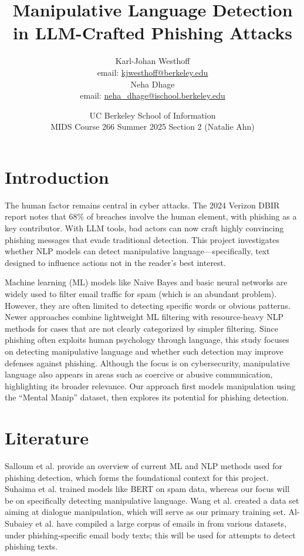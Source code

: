 \documentclass[
	letterpaper, %
	12pt, %
	unnumberedsections, %
	twoside, %
]{LTJournalArticle}
\title{Manipulative Language Detection in LLM-Crafted
Phishing Attacks
}  %
\author{
	Karl-Johan Westhoff \\
	email: \href{mailto:kjwesthoff@berkeley.edu}{kjwesthoff@berkeley.edu} \\
    Neha Dhage \\
	email: \href{mailto:neha_dhage@ischool.berkeley.edu}{neha\_dhage@ischool.berkeley.edu}
}
\date{UC Berkeley School of Information \\
MIDS Course 266 Summer 2025 Section 2 (Natalie Ahn) \\
}
\begin{document}
\maketitle %
\section{Introduction}
The human factor remains central in cyber attacks. The 2024 Verizon DBIR report \cite{verizon2024dbir} notes that 68\% of breaches involve the human element, with phishing as a key contributor. With LLM tools, bad actors can now craft highly convincing phishing messages that evade traditional detection.
This project investigates whether NLP models can detect manipulative language—specifically, text designed to influence actions not in the reader's best interest.

Machine learning (ML) models like Naive Bayes and basic neural networks are widely used to filter email traffic for spam (which is an abundant problem). However, they are often limited to detecting specific words or obvious patterns. Newer approaches combine lightweight ML filtering with resource-heavy NLP methods for cases that are not clearly categorized by simpler filtering. Since phishing often exploits human psychology through language, this study focuses on detecting manipulative language and whether such detection may improve defenses against phishing. Although the focus is on cybersecurity, manipulative language also appears in areas such as coercive or abusive communication, highlighting its broader relevance. Our approach first models manipulation using the “Mental Manip” dataset, then explores its potential for phishing detection.

\section{Literature}
Salloum et al. \cite{SALLOUM202119} provide an overview of current ML and NLP methods used for phishing detection, which forms the foundational context for this project.
Suhaima et al. \cite{ImprovedPhishing} trained models like BERT on spam data, whereas our focus will be on specifically detecting manipulative language.
Wang et al. \cite{MentalManip} created a data set aiming at dialogue manipulation, which will serve as our primary training set.
Al-Subaiey et al. have compiled a large corpus of emails in \cite{PhishingEmailDataset} from various datasets, under phishing-specific email body texts; this will be used for attempts to detect phishing texts.
\end{document}
